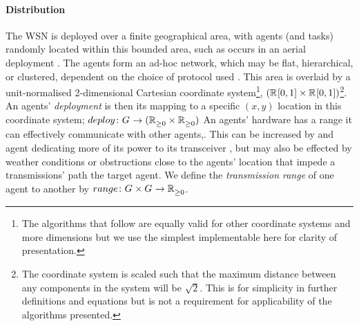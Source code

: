 \paragraph{Distribution}
\label{section:task_and_resources:distribution}
\newcommand{\formalDeployment}[2]{\functionFormal{deploy}{\setAgents{}{}}{(\setRealNumbersNonNegative{}{} \times \setRealNumbersNonNegative{}{})}}
\newcommand{\functionDeployment}[2]{
	\ifx \\1\\
	\functionSignature{deploy}{\setAgents{}{}}
	\else
	\functionSignature{deploy}{#1}
	\fi
}

\newcommand{\formalTransmissionRange}[2]{
	\functionFormal{range}
	{\setAgents{}{} \times \setAgents{}{}}
	{\setRealNumbersNonNegative{}{}}
}
\newcommand{\functionTransmissionRange}[2]{\functionSignature{range}{\varAgent{1}{}, varAgent{2}{}}}

The WSN is deployed over a finite geographical area, with agents (and tasks) randomly located within this bounded area, such as occurs in an aerial deployment \citep{Kumar2013}.  The agents form an ad-hoc network, which may be flat, hierarchical, or clustered, dependent on the choice of protocol used \citep{Carlos-Mancilla2016b}. This area is overlaid by a unit-normalised 2-dimensional Cartesian coordinate system\footnote{The algorithms that follow are equally valid for other coordinate systems and more dimensions but we use the simplest implementable here for clarity of presentation.},  $(\mathbb{R}_{}^{}[0,1] \times \mathbb{R}_{}^{}[0,1])$\footnote{The coordinate system is scaled such that the maximum distance between any components in the system will be $\sqrt{2}$. This is for simplicity in further definitions and equations but is not a requirement for applicability of the algorithms presented.}. An agents' \textit{deployment} is then its mapping to a specific $(x, y)$ location in this coordinate system; $\formalDeployment{}{}$ An agents' hardware has a range it can effectively communicate with other agents,. This can be increased by and agent dedicating more of its power to its transceiver \citep{Padmanabh2008, Song2009, Radman2010}, but may also be effected by weather conditions or obstructions close to the agents' location that impede a transmissions' path the target agent. We define the \textit{transmission range} of one agent to another by $\formalTransmissionRange{}{}$.  

